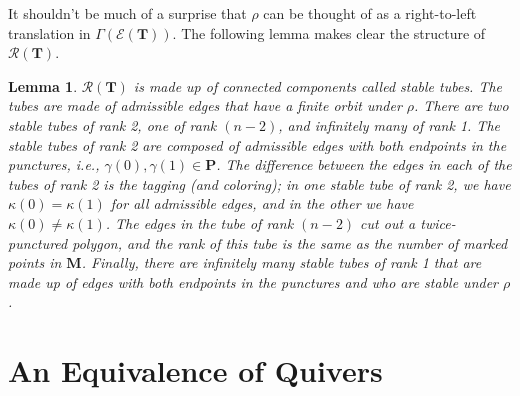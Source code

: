 \documentclass[11pt]{amsart}
\theoremstyle{plain}
\newtheorem{lemma}[theorem]{Lemma}
\theoremstyle{definition}
\numberwithin{equation}{section}
\def\TT{\mathbf{T}}
\def\PP{\mathbf{P}}
\def\MM{\mathbf{M}}
\begin{document}
It shouldn't be much of a surprise that $\rho$ can be thought of as a right-to-left translation in $\Gamma(\mathcal{E(\TT)})$. 
The following lemma makes clear the structure of $\mathcal{R}(\TT)$.

\begin{lemma}
    $\mathcal{R(\TT)}$ is made up of connected components called stable tubes.
    The tubes are made of admissible edges that have a finite orbit under $\rho$.
    There are two stable tubes of rank 2, one of rank $(n-2)$, and infinitely many of rank 1.
    The stable tubes of rank 2 are composed of admissible edges with both endpoints in the punctures, i.e., $\gamma(0), \gamma(1) \in \PP$. 
    The difference between the edges in each of the tubes of rank 2 is the tagging (and coloring); in one stable tube of rank 2, we have $\kappa(0) = \kappa(1)$ for all admissible edges, and in the other we have $\kappa(0) \neq \kappa(1)$.
    The edges in the tube of rank $(n-2)$ cut out a twice-punctured polygon, and the rank of this tube is the same as the number of marked points in $\MM$.
    Finally, there are infinitely many stable tubes of rank 1 that are made up of edges with both endpoints in the punctures and who are stable under $\rho$.
\end{lemma}


\section{An Equivalence of Quivers}
\end{document}
